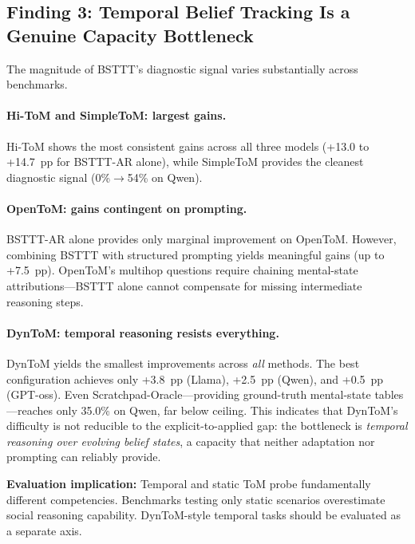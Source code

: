 \subsection{Finding 3: Temporal Belief Tracking Is a Genuine Capacity Bottleneck}
\label{sec:structural_variation}

The magnitude of BSTTT's diagnostic signal varies substantially across benchmarks.

\paragraph{Hi-ToM and SimpleToM: largest gains.}
Hi-ToM shows the most consistent gains across all three models (+13.0 to +14.7~pp for BSTTT-AR alone), while SimpleToM provides the cleanest diagnostic signal (0\%$\rightarrow$54\% on Qwen).

\paragraph{OpenToM: gains contingent on prompting.}
BSTTT-AR alone provides only marginal improvement on OpenToM.
However, combining BSTTT with structured prompting yields meaningful gains (up to +7.5~pp).
OpenToM's multihop questions require chaining mental-state attributions---BSTTT alone cannot compensate for missing intermediate reasoning steps.

\paragraph{DynToM: temporal reasoning resists everything.}
DynToM yields the smallest improvements across \emph{all} methods.
The best configuration achieves only +3.8~pp (Llama), +2.5~pp (Qwen), and +0.5~pp (GPT-oss).
Even Scratchpad-Oracle---providing ground-truth mental-state tables---reaches only 35.0\% on Qwen, far below ceiling.
This indicates that DynToM's difficulty is not reducible to the explicit-to-applied gap: the bottleneck is \emph{temporal reasoning over evolving belief states}, a capacity that neither adaptation nor prompting can reliably provide.

\begin{tcolorbox}[colback=gray!5, colframe=gray!50, boxrule=0.3pt, left=4pt, right=4pt, top=3pt, bottom=3pt]
\textbf{Evaluation implication:}
Temporal and static ToM probe fundamentally different competencies.
Benchmarks testing only static scenarios overestimate social reasoning capability.
DynToM-style temporal tasks should be evaluated as a separate axis.
\end{tcolorbox}


